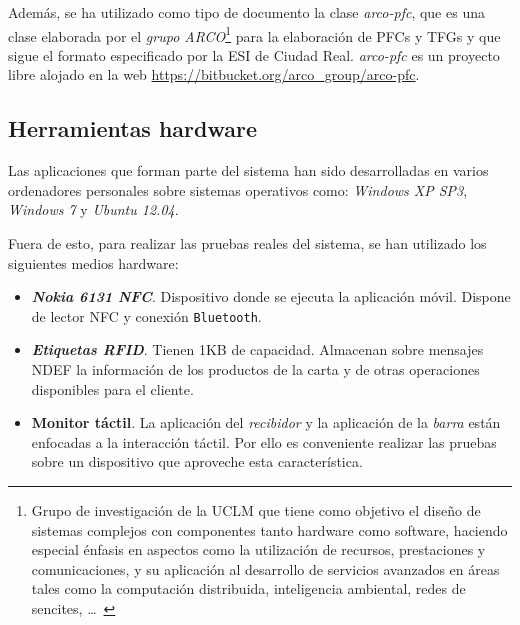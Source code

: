   Además, se ha utilizado como tipo de documento la clase \emph{arco-pfc}, que
  es una clase elaborada por el \emph{grupo \acs{ARCO}}\footnote{Grupo de
  investigación de la \acs{UCLM} que tiene como objetivo el diseño de
  sistemas complejos con componentes tanto hardware como software, haciendo
  especial énfasis en aspectos como la utilización de recursos, prestaciones
  y comunicaciones, y su aplicación al desarrollo de servicios avanzados en
  áreas tales como la computación distribuida, inteligencia ambiental, redes
  de sencites, \dots~\cite{bib:ARCO}} para la elaboración de \acs{PFC}s y
  \acs{TFG}s y que sigue el formato especificado por la \acs{ESI} de Ciudad 
  Real. \emph{arco-pfc} es un proyecto libre alojado en la web
  \url{https://bitbucket.org/arco_group/arco-pfc}.

  \subsection{Herramientas hardware}
  Las aplicaciones que forman parte del sistema han sido desarrolladas en
  varios ordenadores personales sobre sistemas operativos como: \emph{Windows
  XP SP3}, \emph{Windows 7} y \emph{Ubuntu 12.04}.

  Fuera de esto, para realizar las pruebas reales del sistema, se han utilizado
  los siguientes medios hardware:
  \begin{itemize}
  \item \textbf{\emph{Nokia 6131 \acs{NFC}}}. Dispositivo donde se ejecuta
  la aplicación móvil. Dispone de lector \acs{NFC} y conexión \texttt{Bluetooth}.
  \item \textbf{\emph{Etiquetas \acs{RFID}}}. Tienen 1KB de capacidad. 
  Almacenan sobre mensajes \acs{NDEF} la información de los productos de la 
  carta y de otras operaciones disponibles para el cliente.
  \item \textbf{Monitor táctil}. La aplicación del \emph{recibidor} y la 
  aplicación de la \emph{barra} están enfocadas a la interacción táctil. Por 
  ello es conveniente realizar las pruebas sobre un dispositivo que aproveche 
  esta característica. %
  \end{itemize}

